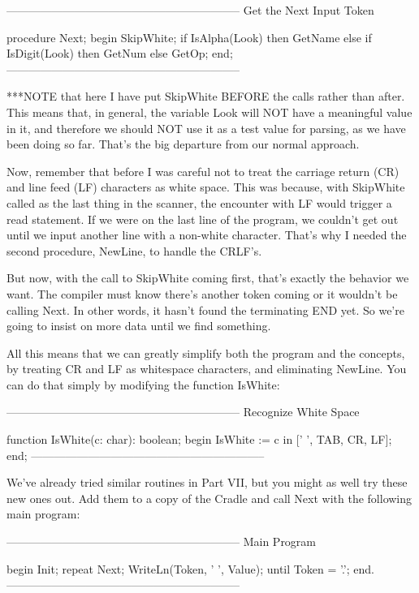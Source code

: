 \documentclass[float=false, crop=false]{standalone}
\begin{document}
\begin{code}
{--------------------------------------------------------------}
{ Get the Next Input Token }

procedure Next;
begin
   SkipWhite;
   if IsAlpha(Look) then GetName
   else if IsDigit(Look) then GetNum
   else GetOp;
end;
{--------------------------------------------------------------}
\end{code}

***NOTE that here I have put SkipWhite BEFORE the calls rather than after. This
means that, in general, the variable Look will NOT have a meaningful value in
it, and therefore we should NOT use it as a test value for parsing, as we have
been doing so far. That's the big departure from our normal approach.

Now, remember that before I was careful not to treat the carriage return (CR)
and line feed (LF) characters as white space. This was because, with SkipWhite
called as the last thing in the scanner, the encounter with LF would trigger a
read statement. If we were on the last line of the program, we couldn't get out
until we input another line with a non-white character. That's why I needed the
second procedure, NewLine, to handle the CRLF's.

But now, with the call to SkipWhite coming first, that's exactly the behavior we
want. The compiler must know there's another token coming or it wouldn't be
calling Next. In other words, it hasn't found the terminating END yet. So we're
going to insist on more data until we find something.

All this means that we can greatly simplify both the program and the concepts,
by treating CR and LF as whitespace characters, and eliminating NewLine. You can
do that simply by modifying the function IsWhite:

\begin{code}
{--------------------------------------------------------------}
{ Recognize White Space }

function IsWhite(c: char): boolean;
begin
   IsWhite := c in [' ', TAB, CR, LF];
end;
{--------------------------------------------------------------}
\end{code}

We've already tried similar routines in Part VII, but you might as well try
these new ones out. Add them to a copy of the Cradle and call Next with the
following main program:

\begin{code}
{--------------------------------------------------------------}
{ Main Program }

begin
   Init;
   repeat
      Next;
      WriteLn(Token, ' ', Value);
   until Token = '.';
end.
{--------------------------------------------------------------}
\end{code}
\end{document}
